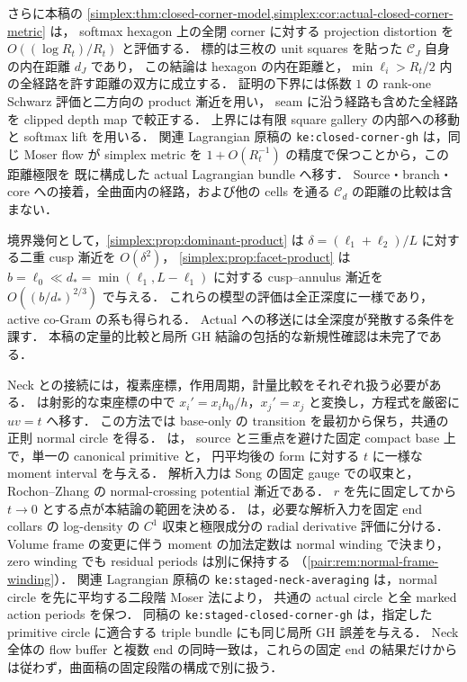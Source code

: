 \documentclass[a4paper,11pt]{ltjsarticle}
\numberwithin{equation}{section}
\theoremstyle{plain}
\theoremstyle{definition}
\theoremstyle{remark}
\begin{document}
さらに本稿の \cref{simplex:thm:closed-corner-model,simplex:cor:actual-closed-corner-metric} は，
softmax hexagon 上の全閉 corner に対する projection distortion を
$O((\log R_t)/R_t)$ と評価する．
標的は三枚の unit squares を貼った $\mathcal C_J$ 自身の内在距離 $d_J$ であり，
この結論は hexagon の内在距離と，$\min\ell_i>R_t/2$ 内の全経路を許す距離の双方に成立する．
証明の下界には係数 $1$ の rank-one Schwarz 評価と二方向の product 漸近を用い，
seam に沿う経路も含めた全経路を clipped depth map で較正する．
上界には有限 square gallery の内部への移動と softmax lift を用いる．
関連 Lagrangian 原稿\cite{LagrangianCurrent}の \texttt{ke:closed-corner-gh} は，同じ Moser flow が
simplex metric を $1+O(R_t^{-1})$ の精度で保つことから，この距離極限を
既に構成した actual Lagrangian bundle へ移す．
Source・branch・core への接着，全曲面内の経路，および他の cells を通る
$\mathcal C_d$ の距離の比較は含まない．

境界幾何として，\cref{simplex:prop:dominant-product} は
$\delta=(\ell_1+\ell_2)/L$ に対する二重 cusp 漸近を $O(\delta^2)$，
\cref{simplex:prop:facet-product} は $b=\ell_0\ll d_*=\min(\ell_1,L-\ell_1)$ に対する
cusp--annulus 漸近を $O((b/d_*)^{2/3})$ で与える．
これらの模型の評価は全正深度に一様であり，active co-Gram の系も得られる．
Actual への移送には全深度が発散する条件を課す．
本稿の定量的比較と局所 GH 結論の包括的な新規性確認は未完了である．

Neck との接続には，複素座標，作用周期，計量比較をそれぞれ扱う必要がある．
 は射影的な束座標の中で
$x_i'=x_i h_0/h$，$x_j'=x_j$ と変換し，方程式を厳密に $uv=t$ へ移す．
この方法では base-only の transition を最初から保ち，共通の正則 normal circle を得る．
 は，
source と三重点を避けた固定 compact base 上で，単一の canonical primitive と，
円平均後の form に対する $t$ に一様な moment interval を与える．
解析入力は Song\cite[Lemmas~4.4--4.5]{SongDegeneration} の固定 gauge での収束と，
Rochon--Zhang\cite[Theorem~5.1]{RochonZhang} の normal-crossing potential 漸近である．
$r$ を先に固定してから $t\to0$ とする点が本結論の範囲を決める．
 は，必要な解析入力を固定 end collars の
log-density の $C^1$ 収束と極限成分の radial derivative 評価に分ける．
Volume frame の変更に伴う moment の加法定数は normal winding で決まり，
zero winding でも residual periods は別に保持する
（\cref{pair:rem:normal-frame-winding}）．
関連 Lagrangian 原稿\cite{LagrangianCurrent}の
\texttt{ke:staged-neck-averaging} は，normal circle を先に平均する二段階 Moser 法により，
共通の actual circle と全 marked action periods を保つ．
同稿の \texttt{ke:staged-closed-corner-gh} は，指定した primitive circle に適合する
triple bundle にも同じ局所 GH 誤差を与える．
Neck 全体の flow buffer と複数 end の同時一致は，これらの固定 end の結果だけからは従わず，曲面稿の固定段階の構成で別に扱う．
\end{document}

